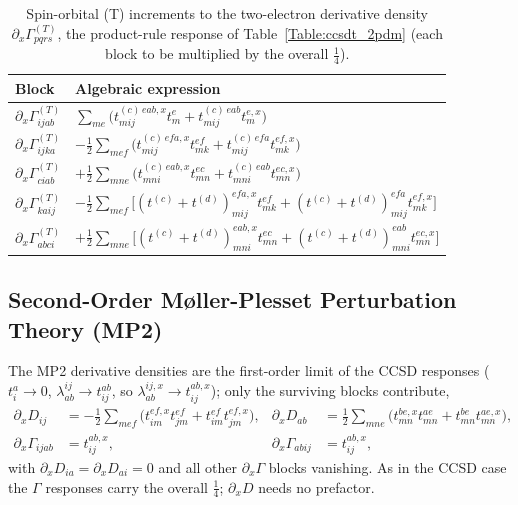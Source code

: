 \documentclass[12pt]{article}
\begin{document}
\begin{table}[H]
\caption{Spin-orbital (T) increments to the two-electron derivative density
$\partial_x\Gamma^{(T)}_{pqrs}$, the product-rule response of
Table~\ref{Table:ccsdt_2pdm} (each block to be multiplied by the overall
$\frac14$).}
\label{Table:ccsdt_deriv_2pdm}
\renewcommand{\arraystretch}{1.6}
\begin{center}
\begin{tabular}{ll}
\hline\hline
Block & Algebraic expression \\
\hline
$\partial_x\Gamma^{(T)}_{ijab}$ & $\displaystyle \sum_{me}\big(t^{(c)\,eab,x}_{mij} t^e_m + t^{(c)\,eab}_{mij} t^{e,x}_m\big)$ \\
$\partial_x\Gamma^{(T)}_{ijka}$ & $\displaystyle -\frac12 \sum_{mef}\big(t^{(c)\,efa,x}_{mij} t^{ef}_{mk} + t^{(c)\,efa}_{mij} t^{ef,x}_{mk}\big)$ \\
$\partial_x\Gamma^{(T)}_{ciab}$ & $\displaystyle +\frac12 \sum_{mne}\big(t^{(c)\,eab,x}_{mni} t^{ec}_{mn} + t^{(c)\,eab}_{mni} t^{ec,x}_{mn}\big)$ \\
$\partial_x\Gamma^{(T)}_{kaij}$ & $\displaystyle -\frac12 \sum_{mef}\big[(t^{(c)}+t^{(d)})^{efa,x}_{mij} t^{ef}_{mk} + (t^{(c)}+t^{(d)})^{efa}_{mij} t^{ef,x}_{mk}\big]$ \\
$\partial_x\Gamma^{(T)}_{abci}$ & $\displaystyle +\frac12 \sum_{mne}\big[(t^{(c)}+t^{(d)})^{eab,x}_{mni} t^{ec}_{mn} + (t^{(c)}+t^{(d)})^{eab}_{mni} t^{ec,x}_{mn}\big]$ \\
\hline\hline
\end{tabular}
\end{center}
\end{table}

\subsection{Second-Order M{\o}ller-Plesset Perturbation Theory (MP2)}

The MP2 derivative densities are the first-order limit of the CCSD responses
($t_i^a\to0$, $\lambda^{ij}_{ab}\to t^{ab}_{ij}$, so $\lambda^{ij,x}_{ab}\to
t^{ab,x}_{ij}$); only the surviving blocks contribute,
\begin{align*}
\partial_x D_{ij} &= -\tfrac12\sum_{mef}\big(t^{ef,x}_{im} t^{ef}_{jm} + t^{ef}_{im} t^{ef,x}_{jm}\big),
&
\partial_x D_{ab} &= \tfrac12\sum_{mne}\big(t^{be,x}_{mn} t^{ae}_{mn} + t^{be}_{mn} t^{ae,x}_{mn}\big),
\\
\partial_x\Gamma_{ijab} &= t^{ab,x}_{ij}, &
\partial_x\Gamma_{abij} &= t^{ab,x}_{ij},
\end{align*}
with $\partial_x D_{ia}=\partial_x D_{ai}=0$ and all other $\partial_x\Gamma$
blocks vanishing.  As in the CCSD case the $\Gamma$ responses carry the overall
$\frac14$; $\partial_x D$ needs no prefactor.
\end{document}
